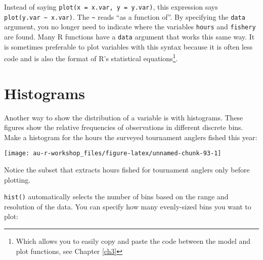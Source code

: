 \documentclass[]{book}
\newenvironment{Shaded}{\begin{snugshade}}{\end{snugshade}}
\newcommand{\KeywordTok}[1]{\textcolor[rgb]{0.13,0.29,0.53}{\textbf{#1}}}
\newcommand{\DataTypeTok}[1]{\textcolor[rgb]{0.13,0.29,0.53}{#1}}
\newcommand{\DecValTok}[1]{\textcolor[rgb]{0.00,0.00,0.81}{#1}}
\newcommand{\StringTok}[1]{\textcolor[rgb]{0.31,0.60,0.02}{#1}}
\newcommand{\CommentTok}[1]{\textcolor[rgb]{0.56,0.35,0.01}{\textit{#1}}}
\newcommand{\OperatorTok}[1]{\textcolor[rgb]{0.81,0.36,0.00}{\textbf{#1}}}
\newcommand{\NormalTok}[1]{#1}
\let\rmarkdownfootnote\footnote%
\def\footnote{\protect\rmarkdownfootnote}
\theoremstyle{definition}
\theoremstyle{definition}
\theoremstyle{definition}
\theoremstyle{remark}
\begin{document}
Instead of saying \texttt{plot(x\ =\ x.var,\ y\ =\ y.var)}, this
expression says \texttt{plot(y.var\ \textasciitilde{}\ x.var)}. The
\texttt{\textasciitilde{}} reads ``as a function of''. By specifying the
\texttt{data} argument, you no longer need to indicate where the
variables \texttt{hours} and \texttt{fishery} are found. Many R
functions have a \texttt{data} argument that works this same way. It is
sometimes preferable to plot variables with this syntax because it is
often less code and is also the format of R's statistical
equations\footnote{Which allows you to easily copy and paste the code
  between the model and plot functions, see Chapter \ref{ch3}}.

\section{Histograms}\label{histograms}

Another way to show the distribution of a variable is with histograms.
These figures show the relative frequencies of observations in different
discrete bins. Make a histogram for the hours the surveyed tournament
anglers fished this year:

\begin{Shaded}
\end{Shaded}

\begin{center}\texttt{[image: au-r-workshop\_files/figure-latex/unnamed-chunk-93-1]} \end{center}

Notice the subset that extracts hours fished for tournament anglers only
before plotting.

\texttt{hist()} automatically selects the number of bins based on the
range and resolution of the data. You can specify how many evenly-sized
bins you want to plot:

\begin{Shaded}
\end{Shaded}
\end{document}
